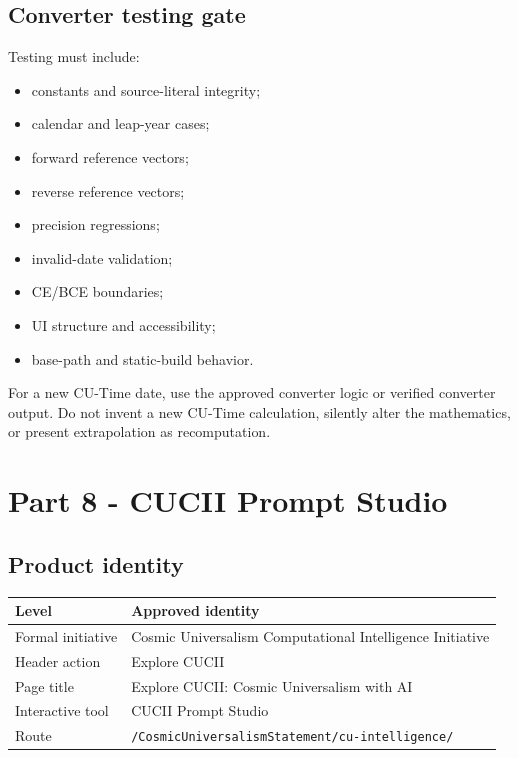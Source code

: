 \documentclass[11pt,letterpaper]{article}
\newcommand{\filepath}[1]{\nolinkurl{#1}}
\begin{document}
\subsection{Converter testing gate}

Testing must include:

\begin{itemize}
    \item constants and source-literal integrity;
    \item calendar and leap-year cases;
    \item forward reference vectors;
    \item reverse reference vectors;
    \item precision regressions;
    \item invalid-date validation;
    \item CE/BCE boundaries;
    \item UI structure and accessibility;
    \item base-path and static-build behavior.
\end{itemize}

\begin{checkpointbox}
For a new CU-Time date, use the approved converter logic or verified converter
output. Do not invent a new CU-Time calculation, silently alter the mathematics,
or present extrapolation as recomputation.
\end{checkpointbox}

\section{Part 8 - CUCII Prompt Studio}

\subsection{Product identity}

\begin{tabularx}{\textwidth}{L{2.0in}Y}
\toprule
\textbf{Level} & \textbf{Approved identity} \\
\midrule
Formal initiative & Cosmic Universalism Computational Intelligence Initiative \\
Header action & Explore CUCII \\
Page title & Explore CUCII: Cosmic Universalism with AI \\
Interactive tool & CUCII Prompt Studio \\
Route & \filepath{/CosmicUniversalismStatement/cu-intelligence/} \\
\bottomrule
\end{tabularx}
\end{document}
